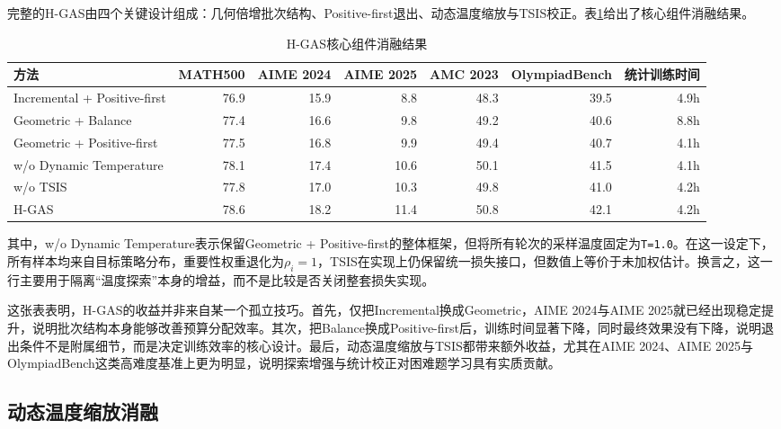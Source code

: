 完整的H-GAS由四个关键设计组成：几何倍增批次结构、Positive-first退出、动态温度缩放与TSIS校正。表\ref{tab:exp_ablation_core_table}给出了核心组件消融结果。

\begin{table}[htbp]
    \centering
    \caption{H-GAS核心组件消融结果}\label{tab:exp_ablation_core_table}
    \small
    \setlength{\tabcolsep}{3.0pt}
    \renewcommand{\arraystretch}{1.15}
    \begin{tabular}{|l|r|r|r|r|r|r|}
    \hline
    \textbf{方法} & \textbf{MATH500} & \textbf{AIME 2024} & \textbf{AIME 2025} & \textbf{AMC 2023} & \textbf{OlympiadBench} & \textbf{统计训练时间} \\
    \hline
    Incremental + Positive-first & 76.9 & 15.9 & 8.8  & 48.3 & 39.5 & 4.9h \\
    Geometric + Balance          & 77.4 & 16.6 & 9.8  & 49.2 & 40.6 & 8.8h \\
    Geometric + Positive-first   & 77.5 & 16.8 & 9.9  & 49.4 & 40.7 & 4.1h \\
    w/o Dynamic Temperature      & 78.1 & 17.4 & 10.6 & 50.1 & 41.5 & 4.1h \\
    w/o TSIS                     & 77.8 & 17.0 & 10.3 & 49.8 & 41.0 & 4.2h \\
    H-GAS                        & 78.6 & 18.2 & 11.4 & 50.8 & 42.1 & 4.2h \\
    \hline
    \end{tabular}
\end{table}

其中，w/o Dynamic Temperature表示保留Geometric + Positive-first的整体框架，但将所有轮次的采样温度固定为\texttt{T=1.0}。在这一设定下，所有样本均来自目标策略分布，重要性权重退化为$\rho_i = 1$，TSIS在实现上仍保留统一损失接口，但数值上等价于未加权估计。换言之，这一行主要用于隔离“温度探索”本身的增益，而不是比较是否关闭整套损失实现。

这张表表明，H-GAS的收益并非来自某一个孤立技巧。首先，仅把Incremental换成Geometric，AIME 2024与AIME 2025就已经出现稳定提升，说明批次结构本身能够改善预算分配效率。其次，把Balance换成Positive-first后，训练时间显著下降，同时最终效果没有下降，说明退出条件不是附属细节，而是决定训练效率的核心设计。最后，动态温度缩放与TSIS都带来额外收益，尤其在AIME 2024、AIME 2025与OlympiadBench这类高难度基准上更为明显，说明探索增强与统计校正对困难题学习具有实质贡献。

\subsection{动态温度缩放消融}
\label{subsec:exp_ablation_temp}

